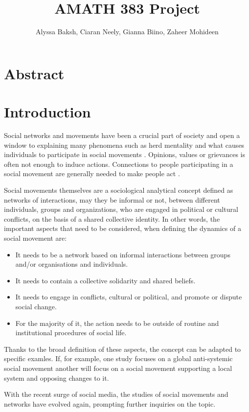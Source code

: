 \documentclass{article}
\title{AMATH 383 Project}
\author{
    Alyssa Baksh, 
    Ciaran Neely,
    Gianna Biino,
    Zaheer Mohideen
}
\begin{document}
    \maketitle

    \section{Abstract}
    \section{Introduction}
    Social networks and movements have been a crucial part of society and open a window to explaining many phenomena such as herd mentality and what causes individuals to participate in social movements \cite{diani_networks_2013}. Opinions, values or grievances is often not enough to induce actions. Connections to people participating in a social movement are generally needed to make people act \cite{small_movements_2021}.
    
    Social movements themselves are a sociological analytical concept defined as networks of interactions, may they be informal or not, between different individuals, groups and organizations, who are engaged in political or cultural conflicts, on the basis of a shared collective identity. In other words, the important aspects that need to be considered, when defining the dynamics of a social movement are: 
    \begin{itemize}
    \item It needs to be a network based on informal interactions between groups and/or organisations and individuals.
    \item It needs to contain a collective solidarity and shared beliefs.
    \item It needs to engage in conflicts, cultural or political, and promote or dispute social change.
    \item  For the majority of it, the action needs to be outside of routine and institutional procedures of social life.
    \end{itemize}
    Thanks to the broad definition of these aspects, the concept can be adapted to specific examles. If, for example, one study focuses on a global anti-systemic social movement another will focus on a social movement supporting a local system and opposing changes to it. \cite{diani_concept_1992}
    
    With the recent surge of social media, the studies of social movements and networks have evolved again, prompting further inquiries on the topic\cite{kumar_structure_2006}.
    
\end{document}

